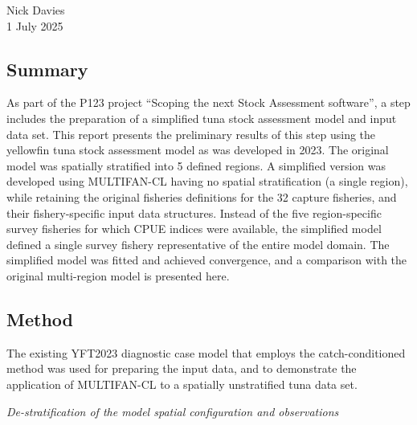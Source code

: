 \documentclass{SCreport}
\begin{document}
\vspace{1ex}

Nick Davies\\
1 July 2025

\vspace{1ex}

\subsection*{Summary}

As part of the P123 project ``Scoping the next Stock Assessment software'', a
step includes the preparation of a simplified tuna stock assessment model and
input data set. This report presents the preliminary results of this step using
the yellowfin tuna stock assessment model as was developed in 2023. The original
model was spatially stratified into 5 defined regions. A simplified version was
developed using MULTIFAN-CL having no spatial stratification (a single region),
while retaining the original fisheries definitions for the 32 capture fisheries,
and their fishery-specific input data structures. Instead of the five
region-specific survey fisheries for which CPUE indices were available, the
simplified model defined a single survey fishery representative of the entire
model domain. The simplified model was fitted and achieved convergence, and a
comparison with the original multi-region model is presented here.

\vspace{1ex}

\subsection*{Method}

The existing YFT2023 diagnostic case model that employs the catch-conditioned
method was used for preparing the input data, and to demonstrate the application
of MULTIFAN-CL to a spatially unstratified tuna data set.

\vspace{1ex}

\textit{De-stratification of the model spatial configuration and observations}
\end{document}
